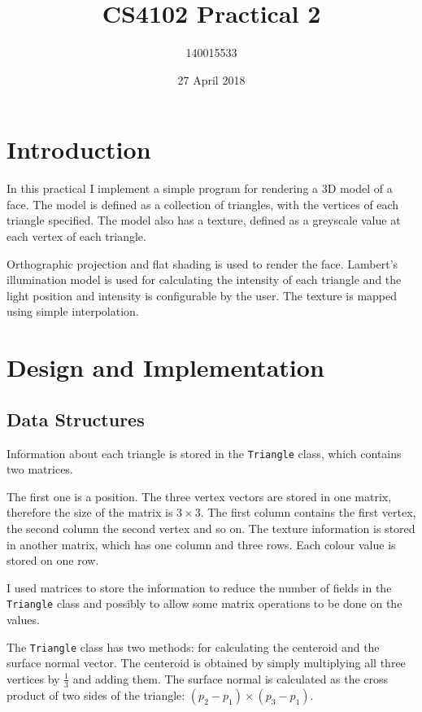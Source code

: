 \documentclass[]{article}
\title{CS4102 Practical 2}
\author{140015533}
\date{27 April 2018}
\begin{document}
\maketitle

\section{Introduction}

In this practical I implement a simple program for rendering a 3D model of a face. The model is defined as a collection of triangles, with the vertices of each triangle specified. The model also has a texture, defined as a greyscale value at each vertex of each triangle.

Orthographic projection and flat shading is used to render the face. Lambert's illumination model is used for calculating the intensity of each triangle and the light position and intensity is configurable by the user. The texture is mapped using simple interpolation.

\section{Design and Implementation}

\subsection{Data Structures}

Information about each triangle is stored in the \texttt{Triangle} class, which contains two matrices.

The first one is a position. The three vertex vectors are stored in one matrix, therefore the size of the matrix is $3 \times 3$. The first column contains the first vertex, the second column the second vertex and so on. The texture information is stored in another matrix, which has one column and three rows. Each colour value is stored on one row.

I used matrices to store the information to reduce the number of fields in the \texttt{Triangle} class and possibly to allow some matrix operations to be done on the values.

The \texttt{Triangle} class has two methods: for calculating the centeroid and the surface normal vector. The centeroid is obtained by simply multiplying all three vertices by $\frac{1}{3}$ and adding them. The surface normal is calculated as the cross product of two sides of the triangle: $(p_2 - p_1) \times (p_3 - p_1)$.
\end{document}
